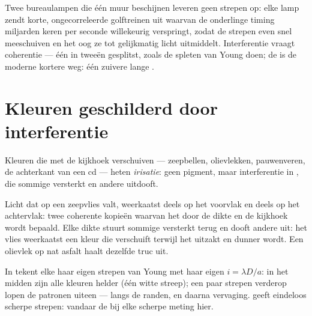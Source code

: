 \begin{remark}\label{rem:g12:light-as-wave:lamps}
Twee bureaulampen die één muur beschijnen leveren geen strepen op: elke
lamp zendt korte, ongecorreleerde golftreinen uit waarvan de onderlinge
timing miljarden keren per seconde willekeurig verspringt, zodat de strepen
even snel meeschuiven en het oog ze tot gelijkmatig licht uitmiddelt.
Interferentie vraagt coherentie --- één  in tweeën gesplitst, zoals
de spleten van Young doen; de  is de moderne kortere weg: één
zuivere lange .
\end{remark}

\section{Kleuren geschilderd door interferentie}

\begin{definition}[Irisatie]\label{def:g12:light-as-wave:iridescence}
Kleuren die met de kijkhoek verschuiven --- zeepbellen, olievlekken,
pauwenveren, de achterkant van een cd --- heten
\emph{irisatie}: geen pigment, maar interferentie in , die sommige  versterkt en andere uitdooft.
\end{definition}

\begin{example}\label{ex:g12:light-as-wave:soap}
Licht dat op een zeepvlies valt, weerkaatst deels op het voorvlak en deels
op het achtervlak: twee coherente kopieën waarvan het 
door de dikte en de kijkhoek wordt bepaald. Elke dikte stuurt sommige
 versterkt terug en dooft andere uit: het vlies weerkaatst een
kleur die verschuift terwijl het uitzakt en dunner wordt. Een olievlek op
nat asfalt haalt dezelfde truc uit.
\end{example}

\begin{remark}\label{rem:g12:light-as-wave:white}
In  tekent elke  haar eigen strepen van Young met haar
eigen $i = \lambda D/a$: in het midden zijn alle kleuren helder (één witte
streep); een paar strepen verderop lopen de patronen uiteen --- 
langs de randen, en daarna vervaging.  geeft
eindeloos scherpe strepen: vandaar de  bij elke scherpe meting hier.
\end{remark}

